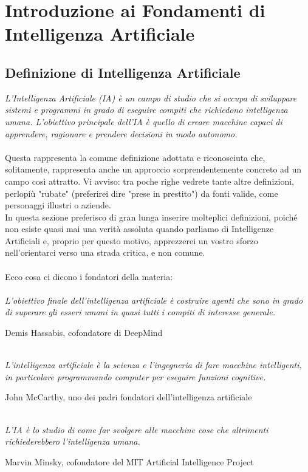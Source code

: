 \documentclass[12pt,a4paper]{report}
\begin{document}
\chapter{Introduzione ai Fondamenti di Intelligenza Artificiale}
\section{Definizione di Intelligenza Artificiale}
\textit{L'Intelligenza Artificiale (IA) è un campo di studio che si occupa di sviluppare sistemi e programmi in grado di eseguire compiti che richiedono intelligenza umana. L'obiettivo principale dell'IA è quello di creare macchine capaci di apprendere, ragionare e prendere decisioni in modo autonomo.\\
\\
} 
Questa rappresenta la comune definizione adottata e riconosciuta che, solitamente, rappresenta anche un approccio sorprendentemente concreto ad un campo così attratto.  
Vi avviso: tra poche righe vedrete tante altre definizioni, perlopiù "rubate" (preferirei dire "prese in prestito") da fonti valide, come personaggi illustri o aziende. \\
In questa sezione preferisco di gran lunga inserire molteplici definizioni, poiché non esiste quasi mai una verità assoluta quando parliamo di Intelligenze Artificiali e, proprio per questo motivo, apprezzerei un vostro sforzo nell'orientarci verso una strada critica, e non comune.\\ \\
Ecco cosa ci dicono i fondatori della materia: \\ \\
\textit{L'obiettivo finale dell'intelligenza artificiale è costruire agenti che sono in grado di superare gli esseri umani in quasi tutti i compiti di interesse generale.}
\begin{flushright}
Demis Hassabis, cofondatore di DeepMind
\end{flushright}
\textit{\\L'intelligenza artificiale è la scienza e l'ingegneria di fare macchine intelligenti, in particolare programmando computer per eseguire funzioni cognitive.}
\begin{flushright}
John McCarthy, uno dei padri fondatori dell'intelligenza artificiale
\end{flushright}
\textit{\\L'IA è lo studio di come far svolgere alle macchine cose che altrimenti richiederebbero l'intelligenza umana.}
\begin{flushright}
Marvin Minsky, cofondatore del MIT Artificial Intelligence Project 
\end{flushright}
\end{document}
